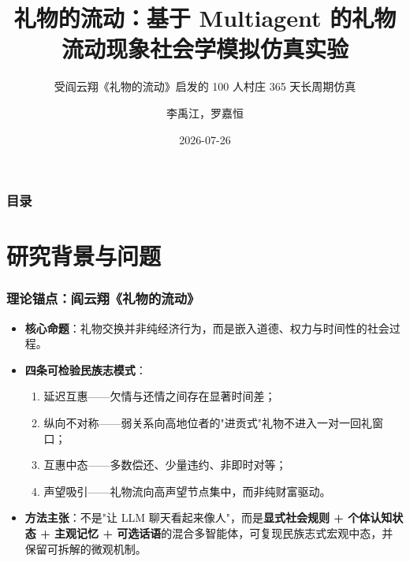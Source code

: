\documentclass[AutoFakeBold,AutoFakeSlant]{beamer}
\author{李禹江，罗嘉恒}
\title{礼物的流动：基于 Multiagent 的礼物流动现象社会学模拟仿真实验}
\subtitle{受阎云翔《礼物的流动》启发的 100 人村庄 365 天长周期仿真}
\institute{选题四：Multi-agent}
\date{2026-07-26}
\begin{document}
\kaishu

\begin{frame}
    \titlepage
\end{frame}

\begin{frame}
    \frametitle{目录}
    \tableofcontents
\end{frame}

\section{研究背景与问题}

\begin{frame}
    \frametitle{理论锚点：阎云翔《礼物的流动》}
    \small
    \begin{itemize}
        \item \textbf{核心命题}：礼物交换并非纯经济行为，而是嵌入道德、权力与时间性的社会过程。
        \item \textbf{四条可检验民族志模式}：
        \begin{enumerate}
            \item 延迟互惠——欠情与还情之间存在显著时间差；
            \item 纵向不对称——弱关系向高地位者的"进贡式"礼物不进入一对一回礼窗口；
            \item 互惠中态——多数偿还、少量违约、非即时对等；
            \item 声望吸引——礼物流向高声望节点集中，而非纯财富驱动。
        \end{enumerate}
        \item \textbf{方法主张}：不是"让 LLM 聊天看起来像人"，而是\textbf{显式社会规则 + 个体认知状态 + 主观记忆 + 可选话语}的混合多智能体，可复现民族志式宏观中态，并保留可拆解的微观机制。
    \end{itemize}
\end{frame}
\end{document}
